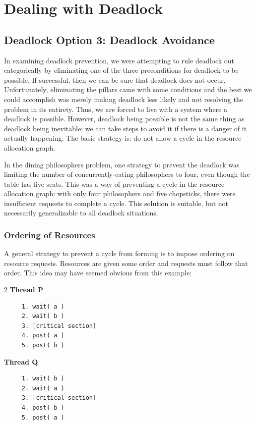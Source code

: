 




\section*{Dealing with Deadlock}

\subsection*{Deadlock Option 3: Deadlock Avoidance}
In examining deadlock prevention, we were attempting to rule deadlock out categorically by eliminating one of the three preconditions for deadlock to be possible. If successful, then we can be sure that deadlock does not occur. Unfortunately, eliminating the pillars came with some conditions and the best we could accomplish was merely making deadlock less likely and not resolving the problem in its entirety. Thus, we are forced to live with a system where a deadlock is possible. However, deadlock being possible is not the same thing as deadlock being inevitable; we can take steps to avoid it if there is a danger of it actually happening. The basic strategy is: do not allow a cycle in the resource allocation graph.

In the dining philosophers problem, one strategy to prevent the deadlock was limiting the number of concurrently-eating philosophers to four, even though the table has five seats. This was a way of preventing a cycle in the resource allocation graph: with only four philosophers and five chopsticks, there were insufficient requests to complete a cycle. This solution is suitable, but not necessarily generalizable to all deadlock situations.

\subsubsection*{Ordering of Resources}
A general strategy to prevent a cycle from forming is to impose ordering on resource requests. Resources are given some order and requests must follow that order. This idea may have seemed obvious from this example:

\begin{multicols}{2}
	\textbf{Thread P}\vspace{-2em}
	\begin{verbatim}
	 1. wait( a ) 
	 2. wait( b )
	 3. [critical section]
	 4. post( a )
	 5. post( b )
  \end{verbatim}
	\columnbreak
	\textbf{Thread Q}\vspace{-2em}
	\begin{verbatim}
	 1. wait( b ) 
	 2. wait( a )
	 3. [critical section]
	 4. post( b )
	 5. post( a )
  \end{verbatim}
\end{multicols}
\vspace{-2em}

